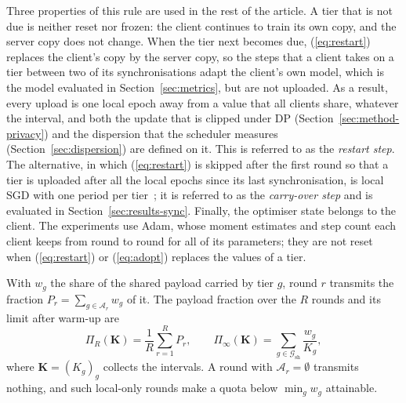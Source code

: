 \documentclass[journal]{IEEEtran}
\begin{document}
Three properties of this rule are used in the rest of the article. A tier that is not due is neither reset nor frozen: the client continues to train its own copy, and the server copy does not change. When the tier next becomes due, (\ref{eq:restart}) replaces the client's copy by the server copy, so the steps that a client takes on a tier between two of its synchronisations adapt the client's own model, which is the model evaluated in Section~\ref{sec:metrics}, but are not uploaded. As a result, every upload is one local epoch away from a value that all clients share, whatever the interval, and both the update that is clipped under DP (Section~\ref{sec:method-privacy}) and the dispersion that the scheduler measures (Section~\ref{sec:dispersion}) are defined on it. This is referred to as the \emph{restart step}. The alternative, in which (\ref{eq:restart}) is skipped after the first round so that a tier is uploaded after all the local epochs since its last synchronisation, is local SGD with one period per tier~\cite{stich2019,wang2021coop}; it is referred to as the \emph{carry-over step} and is evaluated in Section~\ref{sec:results-sync}. Finally, the optimiser state belongs to the client. The experiments use Adam, whose moment estimates and step count each client keeps from round to round for all of its parameters; they are not reset when (\ref{eq:restart}) or (\ref{eq:adopt}) replaces the values of a tier.

With $w_g$ the share of the shared payload carried by tier $g$, round $r$ transmits the fraction $P_r=\sum_{g\in\mathcal A_r}w_g$ of it. The payload fraction over the $R$ rounds and its limit after warm-up are
\begin{equation}
\Pi_R(\mathbf K)=\frac1R\sum_{r=1}^RP_r,\qquad \Pi_\infty(\mathbf K)=\sum_{g\in\mathcal G_{\mathrm{sh}}}\frac{w_g}{K_g},
\label{eq:payload}
\end{equation}
where $\mathbf K=(K_g)_g$ collects the intervals. A round with $\mathcal A_r=\emptyset$ transmits nothing, and such local-only rounds make a quota below $\min_gw_g$ attainable.
\end{document}
